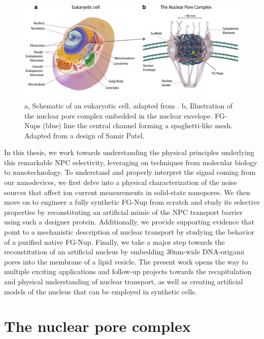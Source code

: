 \begin{figure}[!htbp]
	\centering
	\includegraphics[width=1\linewidth]{figures/Figure1.1.pdf}
	\caption{a, Schematic of an eukaryotic cell, adapted from \cite{url:https://www.genome.gov/genetics-glossary/Organelle}. b, Illustration of the nuclear pore complex embedded in the nuclear envelope. FG-Nups (blue) line the central channel forming a spaghetti-like mesh. Adapted from a design of Samir Patel.}
	\label{fig:fig1.1}
\end{figure}


\noindent In this thesis, we work towards understanding the physical principles underlying this remarkable NPC selectivity, leveraging on techniques from molecular biology to nanotechnology. To understand and properly interpret the signal coming from our nanodevices, we first delve into a physical characterization of the noise sources that affect ion current measurements in solid-state nanopores. We then move on to engineer a fully synthetic FG-Nup from scratch and study its selective properties by reconstituting an artificial mimic of the NPC transport barrier using such a designer protein. Additionally, we provide supporting evidence that point to a mechanistic description of nuclear transport by studying the behavior of a purified native FG-Nup. Finally, we take a major step towards the reconstitution of an artificial nucleus by embedding 30nm-wide DNA-origami pores into the membrane of a lipid vesicle. The present work opens the way to multiple exciting applications and follow-up projects towards the recapitulation and physical understanding of nuclear transport, as well as creating artificial models of the nucleus that can be employed in synthetic cells.

\section{The nuclear pore complex}
